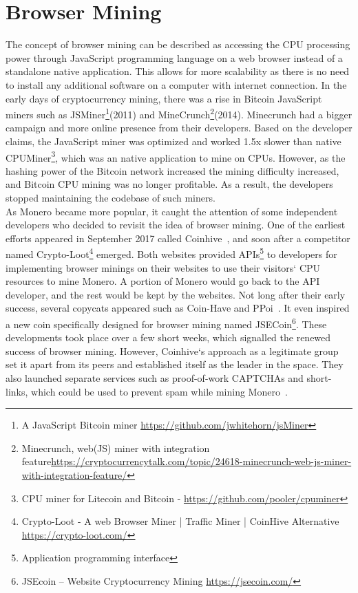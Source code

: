 \section{Browser Mining}
The concept of browser mining can be described as accessing the CPU processing power through JavaScript programming language on a web browser instead of a standalone native application. This allows for more scalability as there is no need to install any additional software on a computer with internet connection. In the early days of cryptocurrency mining, there was a rise in Bitcoin JavaScript miners such as JSMiner\footnote{A JavaScript Bitcoin miner \url{https://github.com/jwhitehorn/jsMiner}}(2011) and MineCrunch\footnote{Minecrunch, web(JS) miner with integration feature\url{https://cryptocurrencytalk.com/topic/24618-minecrunch-web-js-miner-with-integration-feature/}}(2014). Minecrunch had a bigger campaign and more online presence from their developers. Based on the developer claims, the JavaScript miner was optimized and worked 1.5x slower than native CPUMiner\footnote{CPU miner for Litecoin and Bitcoin - \url{https://github.com/pooler/cpuminer}}, which was an native application to mine on CPUs. However, as the hashing power of the Bitcoin network increased the mining difficulty increased, and Bitcoin CPU mining was no longer profitable. As a result, the developers stopped maintaining the codebase of such miners.
\\
As Monero became more popular, it caught the attention of some independent developers who decided to revisit the idea of browser mining. One of the earliest efforts appeared in September 2017 called Coinhive~\cite{coinhive}, and soon after a competitor named Crypto-Loot\footnote{Crypto-Loot - A web Browser Miner | Traffic Miner | CoinHive Alternative \url{https://crypto-loot.com/}} emerged. Both websites provided APIs\footnote{Application programming interface} to developers for implementing browser minings on their websites to use their visitors` CPU resources to mine Monero. A portion of Monero would go back to the API developer, and the rest would be kept by the websites. Not long after their early success, several copycats appeared such as Coin-Have and PPoi~\cite{coinhivecopycats}. It even inspired a new coin specifically designed for browser mining named JSECoin\footnote{JSEcoin – Website Cryptocurrency Mining \url{https://jsecoin.com/}}. These developments took place over a few short weeks, which signalled the renewed success of browser mining. However, Coinhive`s approach as a legitimate group set it apart from its peers and established itself as the leader in the space. They also launched separate services such as proof-of-work CAPTCHAs and short-links, which could be used to prevent spam while mining Monero~\cite{coinhive}.

